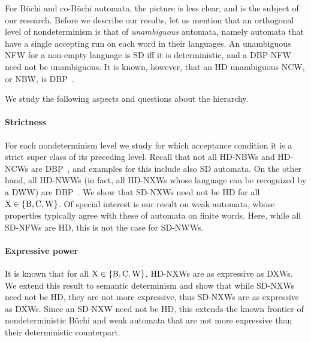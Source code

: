 \documentclass[10pt,a4paper]{amsart}
\theoremstyle{definition}
\numberwithin{equation}{section}
\newcommand{\dxws}{DXWs\xspace}
\newcommand{\nxw}{NXW\xspace}
\newcommand{\nxws}{NXWs\xspace}
\begin{document}
For B\"uchi and co-B\"uchi automata, the picture is less clear, and is the subject of our research. Before we describe our results, let us mention that an orthogonal level of nondeterminism is that of {\em unambiguous\/} automata, namely automata that have a single accepting run on each word in their languages. An unambiguous NFW for a non-empty language is SD iff it is deterministic, and a DBP-NFW need not be unambiguous. It is known, however, that an HD unambiguous NCW, or NBW, is DBP~\cite{BKS17}.

We study the following aspects and questions about the hierarchy. 

\paragraph{Strictness} For each nondeterminism level we study for which acceptance condition it is a strict super class of its preceding level. Recall that not all HD-NBWs and HD-NCWs are DBP~\cite{BKKS13}, and examples for this include also SD automata. On the other hand, all HD-NWWs (in fact, all HD-\nxws whose language can be recognized by a DWW) are DBP~\cite{BKS17}. We show that SD-\nxws need not be HD for all ${\rm X} \in \{{\rm B,C,W}\}$. Of special interest is our result on weak automata, whose properties typically agree with these of automata on finite words. Here, while all SD-NFWs are HD, this is not the case for SD-NWWs. 

\paragraph{Expressive power} It is known that for all ${\rm X} \in \{{\rm B,C,W}\}$, HD-\nxws are as expressive as \dxws. We extend this result to semantic determinism and show that while SD-\nxws need not be HD, they are not more expressive, thus SD-\nxws are as expressive as \dxws. Since an SD-\nxw need not be HD, this extends the known frontier of nondeterministic B\"uchi and weak automata that are not more expressive than their deterministic counterpart. 
\end{document}
